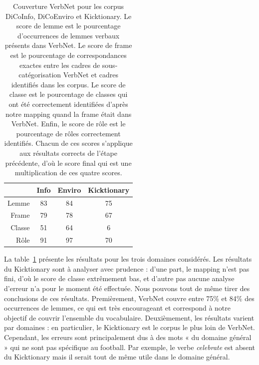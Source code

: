 \begin{table}[h]
\centering
\begin{tabular}{rccc}
  \toprule
         & Info & Enviro & Kicktionary \\
  \midrule
  Lemme  & 83 & 84 & 75 \\
  Frame  & 79 & 78 & 67 \\
  Classe & 51 & 64 & 6  \\
  Rôle   & 91 & 97 & 70 \\
  \bottomrule
\end{tabular}

\caption{\label{table:coverage} Couverture VerbNet pour les corpus DiCoInfo,
    DiCoEnviro et Kicktionary. Le score de lemme est le pourcentage
    d'occurrences de lemmes verbaux présents dans VerbNet. Le score de frame
    est le pourcentage de correspondances exactes entre les cadres de
    sous-catégorisation VerbNet et cadres identifiés dans les corpus. Le score
    de classe est le pourcentage de classes qui ont été correctement
    identifiées d'après notre mapping quand la frame était dans VerbNet. Enfin,
    le score de rôle est le pourcentage de rôles correctement identifiés.
    Chacun de ces scores s'applique aux résultats corrects de l'étape
    précédente, d'où le score final qui est une multiplication de ces quatre
    scores.}

\end{table}

La table~\ref{table:coverage} présente les résultats pour les trois domaines
considérés. Les résultats du Kicktionary sont à analyser avec prudence : d'une
part, le mapping n'est pas fini, d'où le score de classe extrêmement bas, et
d'autre pas aucune analyse d'erreur n'a pour le moment été effectuée. Nous
pouvons tout de même tirer des conclusions de ces résultats. Premièrement,
VerbNet couvre entre 75\% et 84\% des occurrences de lemmes, ce qui est très
encourageant et correspond à notre objectif de couvrir l'ensemble du
vocabulaire.
Deuxièmement, les résultats varient par domaines : en particulier, le
Kicktionary est le corpus le plus loin de VerbNet. Cependant, les erreurs sont
principalement dus à des mots « du domaine général » qui ne sont pas spécifique
au football. Par exemple, le verbe \emph{celebrate} est absent du Kicktionary
mais il serait tout de même utile dans le domaine général.

